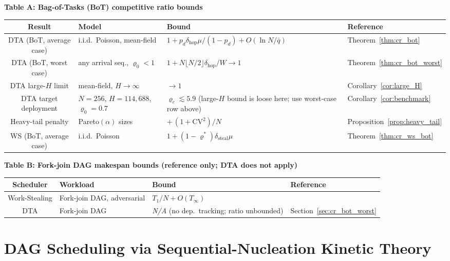 \documentclass[11pt,a4paper]{article}
\begin{document}
\medskip
\noindent\textbf{Table A: Bag-of-Tasks (BoT) competitive ratio bounds}

\begin{center}
\begin{tabularx}{\textwidth}{@{}clXl@{}}
\toprule
Result & Model & Bound & Reference \\
\midrule
DTA (BoT, average case) & i.i.d.\ Poisson, mean-field
  & $1 + p_d\delta_{\mathrm{hop}}\mu/(1-p_d) + O(\ln N/\bar q)$
  & Theorem~\ref{thm:cr_bot} \\
DTA (BoT, worst case) & any arrival seq., $\varrho_0 < 1$
  & $1 + N\lfloor N/2\rfloor\delta_{\mathrm{hop}}/W \to 1$
  & Theorem~\ref{thm:cr_bot_worst} \\
DTA large-$H$ limit & mean-field, $H\to\infty$
  & $\to 1$
  & Corollary~\ref{cor:large_H} \\
DTA target deployment & $N=256$, $H=114{,}688$, $\varrho_0{=}0.7$
  & $\varrho_c \lesssim 5.9$ (large-$H$ bound is loose here; use worst-case row above)
  & Corollary~\ref{cor:benchmark} \\
Heavy-tail penalty & Pareto$(\alpha)$ sizes
  & $+\,(1+\mathrm{CV}^2)/N$
  & Proposition~\ref{prop:heavy_tail} \\
WS (BoT, average case) & i.i.d.\ Poisson
  & $1 + (1-\varrho^*)\delta_{\mathrm{steal}}\mu$
  & Theorem~\ref{thm:cr_ws_bot} \\
\bottomrule
\end{tabularx}
\end{center}

\medskip
\noindent\textbf{Table B: Fork-join DAG makespan bounds (reference only; DTA does not apply)}

\begin{center}
\begin{tabularx}{\textwidth}{@{}clXl@{}}
\toprule
Scheduler & Workload & Bound & Reference \\
\midrule
Work-Stealing & Fork-join DAG, adversarial & $T_1/N + O(T_\infty)$ & \cite{blumofe1999} \\
DTA & Fork-join DAG & \textit{N/A} (no dep.\ tracking; ratio unbounded) & Section~\ref{sec:cr_bot_worst} \\
\bottomrule
\end{tabularx}
\end{center}


\section{DAG Scheduling via Sequential-Nucleation Kinetic Theory}
\label{sec:dag_kinetic}
\end{document}
